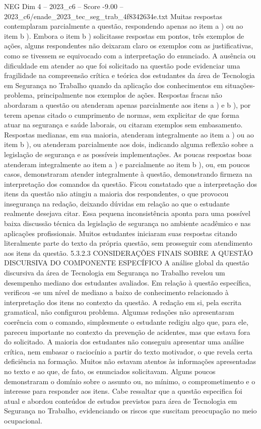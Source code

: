 \begin{textsample}{NEG Dim 4 – 2023\_c6 – Score -9.00 – 2023\_c6/enade\_2023\_tec\_seg\_trab\_4f8342634e.txt}
Muitas respostas contemplaram parcialmente a questão, respondendo apenas ao item a ) ou ao item b ).
Embora o item b ) solicitasse respostas em pontos, três exemplos de ações, alguns respondentes não deixaram claro os exemplos com as justificativas, como se tivessem se equivocado com a interpretação do enunciado.
A ausência ou dificuldade em atender ao que foi solicitado na questão pode evidenciar uma fragilidade na compreensão crítica e teórica dos estudantes da área de Tecnologia em Segurança no Trabalho quando da aplicação dos conhecimentos em situações-problema, principalmente nos exemplos de ações.
Respostas fracas não abordaram a questão ou atenderam apenas parcialmente aos itens a ) e b ), por terem apenas citado o cumprimento de normas, sem explicitar de que forma atuar na segurança e saúde laborais, ou citaram exemplos sem embasamento.
Respostas medianas, em sua maioria, atenderam integralmente ao item a ) ou ao item b ), ou atenderam parcialmente aos dois, indicando alguma reflexão sobre a legislação de segurança e as possíveis implementações.
As poucas respostas boas atenderam integralmente ao item a ) e parcialmente ao item b ), ou, em poucos casos, demonstraram atender integralmente à questão, demonstrando firmeza na interpretação dos comandos da questão.
Ficou constatado que a interpretação dos itens da questão não atingiu a maioria dos respondentes, o que provocou insegurança na redação, deixando dúvidas em relação ao que o estudante realmente desejava citar.
Essa pequena inconsistência aponta para uma possível baixa discussão técnica da legislação de segurança no ambiente acadêmico e nas aplicações profissionais.
Muitos estudantes iniciaram suas respostas citando literalmente parte do texto da própria questão, sem prosseguir com atendimento aos itens da questão. 5.3.2.3 CONSIDERAÇÕES FINAIS SOBRE A QUESTÃO DISCURSIVA DO COMPONENTE ESPECÍFICO A análise global da questão discursiva da área de Tecnologia em Segurança no Trabalho revelou um desempenho mediano dos estudantes avaliados.
Em relação à questão específica, verificou -se um nível de mediano a baixo de conhecimento relacionado à interpretação dos itens no contexto da questão.
A redação em si, pela escrita gramatical, não configurou problema.
Algumas redações não apresentaram coerência com o comando, simplesmente o estudante redigiu algo que, para ele, pareceu importante no contexto da prevenção de acidentes, mas que estava fora do solicitado.
A maioria dos estudantes não conseguiu apresentar uma análise crítica, nem embasar o raciocínio a partir do texto motivador, o que revela certa deficiência na formação.
Muitos não estavam atentos às informações apresentadas no texto e ao que, de fato, os enunciados solicitavam.
Alguns poucos demonstraram o domínio sobre o assunto ou, no mínimo, o comprometimento e o interesse para responder aos itens.
Cabe ressaltar que a questão especifica foi atual e abordou conteúdos de estudos previstos para área de Tecnologia em Segurança no Trabalho, evidenciando os riscos que suscitam preocupação no meio ocupacional.

\end{textsample}
